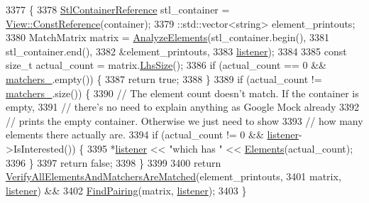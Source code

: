 \begin{DoxyCode}
3377                                                                     \{
3378     \hyperlink{classtesting_1_1internal_1_1UnorderedElementsAreMatcherImpl_acf64d0e328361d4796bcf1aeb91ed975}{StlContainerReference} stl\_container = 
      \hyperlink{classtesting_1_1internal_1_1StlContainerView_a36eccf53329730f6e55c12002128bf25}{View::ConstReference}(container);
3379     ::std::vector<string> element\_printouts;
3380     MatchMatrix matrix = \hyperlink{classtesting_1_1internal_1_1UnorderedElementsAreMatcherImpl_a327b473a760be4b4e0b3495b4e15a7e8}{AnalyzeElements}(stl\_container.begin(),
3381                                          stl\_container.end(),
3382                                          &element\_printouts,
3383                                          \hyperlink{namespaceinteractive__marker_a0e579ab555212bb5e2c9f8a675b7618a}{listener});
3384 
3385     \textcolor{keyword}{const} \textcolor{keywordtype}{size\_t} actual\_count = matrix.\hyperlink{classtesting_1_1internal_1_1MatchMatrix_a337d9793c61d985dbc1be166e34eed61}{LhsSize}();
3386     \textcolor{keywordflow}{if} (actual\_count == 0 && \hyperlink{classtesting_1_1internal_1_1UnorderedElementsAreMatcherImpl_a8f369b32578badf837a76ee66b033c81}{matchers\_}.empty()) \{
3387       \textcolor{keywordflow}{return} \textcolor{keyword}{true};
3388     \}
3389     \textcolor{keywordflow}{if} (actual\_count != \hyperlink{classtesting_1_1internal_1_1UnorderedElementsAreMatcherImpl_a8f369b32578badf837a76ee66b033c81}{matchers\_}.size()) \{
3390       \textcolor{comment}{// The element count doesn't match.  If the container is empty,}
3391       \textcolor{comment}{// there's no need to explain anything as Google Mock already}
3392       \textcolor{comment}{// prints the empty container. Otherwise we just need to show}
3393       \textcolor{comment}{// how many elements there actually are.}
3394       \textcolor{keywordflow}{if} (actual\_count != 0 && \hyperlink{namespaceinteractive__marker_a0e579ab555212bb5e2c9f8a675b7618a}{listener}->IsInterested()) \{
3395         *\hyperlink{namespaceinteractive__marker_a0e579ab555212bb5e2c9f8a675b7618a}{listener} << \textcolor{stringliteral}{"which has "} << \hyperlink{classtesting_1_1internal_1_1UnorderedElementsAreMatcherImplBase_ab6d5a2342e07730b913f419cf662d16a}{Elements}(actual\_count);
3396       \}
3397       \textcolor{keywordflow}{return} \textcolor{keyword}{false};
3398     \}
3399 
3400     \textcolor{keywordflow}{return} \hyperlink{classtesting_1_1internal_1_1UnorderedElementsAreMatcherImplBase_a515ec900bd84fe4d28e3ccf55db25822}{VerifyAllElementsAndMatchersAreMatched}(element\_printouts,
3401                                                   matrix, \hyperlink{namespaceinteractive__marker_a0e579ab555212bb5e2c9f8a675b7618a}{listener}) &&
3402            \hyperlink{namespacetesting_1_1internal_af2bd2e350b56422a3d9d3b986ac1df0e}{FindPairing}(matrix, \hyperlink{namespaceinteractive__marker_a0e579ab555212bb5e2c9f8a675b7618a}{listener});
3403   \}
\end{DoxyCode}
